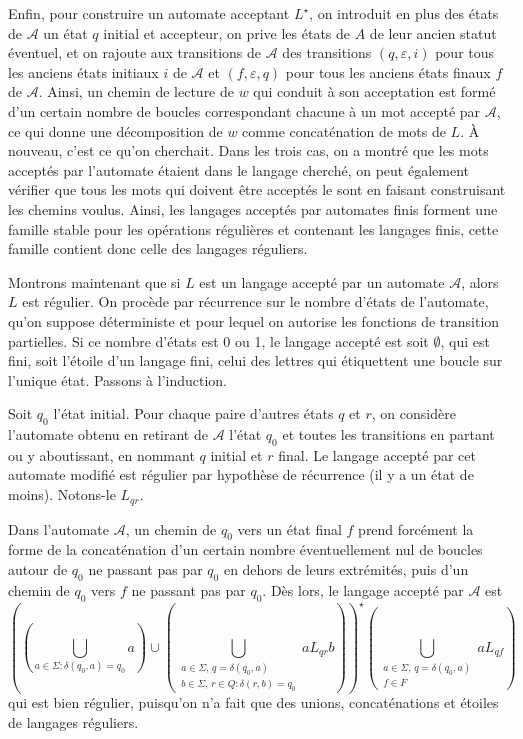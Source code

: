 \begin{preuve}
Enfin, pour construire un automate acceptant $L^\star$, on introduit en plus des états de $\mathcal A$ un état $q$ initial et accepteur, on prive les états de $A$ de leur ancien statut éventuel, et on rajoute aux transitions de $\mathcal A$ des transitions $(q,\varepsilon,i)$ pour tous les anciens états initiaux $i$ de $\mathcal A$ et $(f,\varepsilon,q)$ pour tous les anciens états finaux $f$ de $\mathcal A$. Ainsi, un chemin de lecture de $w$ qui conduit à son acceptation est formé d'un certain nombre de boucles correspondant chacune à un mot accepté par $\mathcal A$, ce qui donne une décomposition de $w$ comme concaténation de mots de $L$. À nouveau, c'est ce qu'on cherchait. Dans les trois cas, on a montré que les mots acceptés par l'automate étaient dans le langage cherché, on peut également vérifier que tous les mots qui doivent être acceptés le sont en faisant construisant les chemins voulus.
Ainsi, les langages acceptés par automates finis forment une famille stable pour les opérations régulières et contenant les langages finis, cette famille contient donc celle des langages réguliers.

Montrons maintenant que si $L$ est un langage accepté par un automate $\mathcal A$, alors $L$ est régulier. On procède par récurrence sur le nombre d'états de l'automate, qu'on suppose déterministe et pour lequel on autorise les fonctions de transition partielles. Si ce nombre d'états est 0 ou 1, le langage accepté est soit $\emptyset$, qui est fini, soit l'étoile d'un langage fini, celui des lettres qui étiquettent une boucle sur l'unique état. Passons à l'induction.

Soit $q_0$ l'état initial. Pour chaque paire d'autres états $q$ et $r$, on considère l'automate obtenu en retirant de $\mathcal A$ l'état $q_0$ et toutes les transitions en partant ou y aboutissant, en nommant $q$ initial et $r$ final. Le langage accepté par cet automate modifié est régulier par hypothèse de récurrence (il y a un état de moins). Notons-le $L_{qr}$.

Dans l'automate $\mathcal A$, un chemin de $q_0$ vers un état final $f$ prend forcément la forme de la concaténation d'un certain nombre éventuellement nul de boucles autour de $q_0$ ne passant pas par $q_0$ en dehors de leurs extrémités, puis d'un chemin de $q_0$ vers $f$ ne passant pas par $q_0$. Dès lors, le langage accepté par $\mathcal A$ est
$$
\left( (\bigcup_{a\in\Sigma : \delta(q_0,a)=q_0} a) \cup
(\bigcup_{\substack{a\in\Sigma,\,q=\delta(q_0,a)\\ b\in \Sigma,\, r\in Q: \delta(r,b)=q_0}} aL_{qr}b)
\right) ^\star
\left(
\bigcup_{\substack{a\in\Sigma,\, q=\delta(q_0,a)\\ f\in F}} aL_{qf}
\right)
$$
qui est bien régulier, puisqu'on n'a fait que des unions, concaténations et étoiles de langages réguliers.
\end{preuve}

